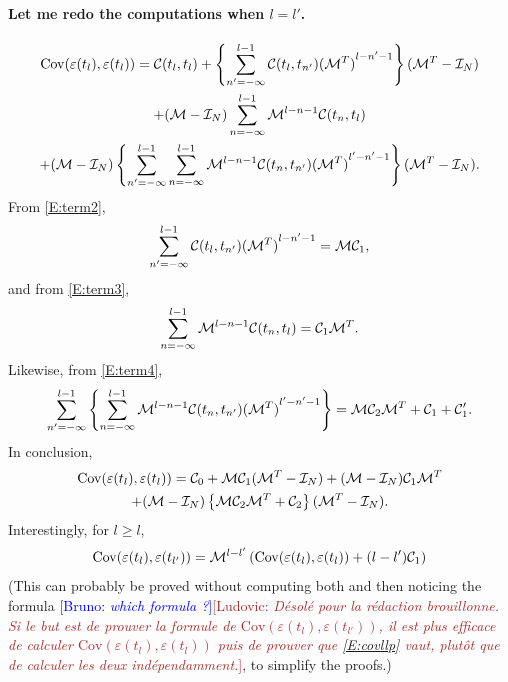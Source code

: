 \documentclass{article}
\newcommand{\B}[1]{{\textcolor{blue}{[Bruno: \textit{#1}]}}}
\renewcommand{\L}[1]{{\textcolor{Brown}{[Ludovic: \textit{#1}]}}}
\begin{document}
\paragraph{Let me redo the computations when $l=l'$.}

\begin{multline}
    \mathrm{Cov}(\varepsilon(t_l),\varepsilon(t_{l}))
    =
    {\mathcal C}(t_l,t_{l})+
    \left\{
    \sum_{n'=-\infty}^{l-1}{\mathcal C}(t_l,t_{n'}){({\mathcal M}^T)}^{l-n'-1}
    \right\}({\mathcal M}^T-{\mathcal I}_N)
    \\
    +
    ({\mathcal M}-{\mathcal I}_N)\sum_{n=-\infty}^{l-1}{{\mathcal M}}^{l-n-1}{\mathcal C}(t_n,t_{l})
    \\
    +
    ({\mathcal M}-{\mathcal I}_N)
    \left\{
        \sum_{n'=-\infty}^{l-1}\sum_{n=-\infty}^{l-1}{{\mathcal M}}^{l-n-1}{\mathcal C}(t_n,t_{n'}){({\mathcal M}^T)}^{l'-n'-1}
    \right\}
    ({\mathcal M}^T-{\mathcal I}_N).
\end{multline}
From \eqref{E:term2},
\begin{equation}\label{E:term2bis}
\sum_{n'=-\infty}^{l-1}{\mathcal C}(t_l,t_{n'}){({\mathcal M}^T)}^{l-n'-1}
=
{\mathcal M}{\mathcal C}_{1}
,
\end{equation}
and from \eqref{E:term3},
\begin{equation}\label{E:term3bis}
\sum_{n=-\infty}^{l-1}{{\mathcal M}}^{l-n-1}{\mathcal C}(t_n,t_{l})
=
{\mathcal C}_{1}{\mathcal M}^T.
\end{equation}
Likewise, from \eqref{E:term4},
\begin{equation}\label{E:term4bis}
\sum_{n'=-\infty}^{l-1}
    \left\{
        \sum_{n=-\infty}^{l-1}{{\mathcal M}}^{l-n-1}{\mathcal C}(t_n,t_{n'}){({\mathcal M}^T)}^{l'-n'-1}
    \right\} 
    ={\mathcal M} {\mathcal C}_2 {\mathcal M}^T+{\mathcal C}_1+{\mathcal C}_1'.
\end{equation}
In conclusion,
\begin{multline}\label{E:concl}
    \mathrm{Cov}(\varepsilon(t_l),\varepsilon(t_{l}))
    =
    {\mathcal C}_0+{\mathcal M}{\mathcal C}_{1}({\mathcal M}^T-{\mathcal I}_N)
    +
    ({\mathcal M}-{\mathcal I}_N){\mathcal C}_{1}{\mathcal M}^T
    \\
    +
    ({\mathcal M}-{\mathcal I}_N)
    \left\{
        {\mathcal M} {\mathcal C}_2 {\mathcal M}^T+{\mathcal C}_2
    \right\}
    ({\mathcal M}^T-{\mathcal I}_N).
\end{multline}
Interestingly, for $l\geq l$,
\begin{equation}\label{E:covllp}
\mathrm{Cov}(\varepsilon(t_l),\varepsilon(t_{l'}))
=
{\mathcal M}^{l-l'}\left(
\mathrm{Cov}(\varepsilon(t_l),\varepsilon(t_{l}))+
(l-l'){\mathcal C}_1
\right)
\end{equation}
(This can probably be proved without computing both and then noticing the formula \B{which formula ?}\L{Désolé pour la rédaction brouillonne. Si le but est de prouver la formule de $\mathrm{Cov}(\varepsilon(t_l),\varepsilon(t_{l'}))$, il est plus efficace de calculer $\mathrm{Cov}(\varepsilon(t_l),\varepsilon(t_{l}))$ puis de prouver que \eqref{E:covllp} vaut, plutôt que de calculer les deux indépendamment.}, to simplify the proofs.)
\end{document}
